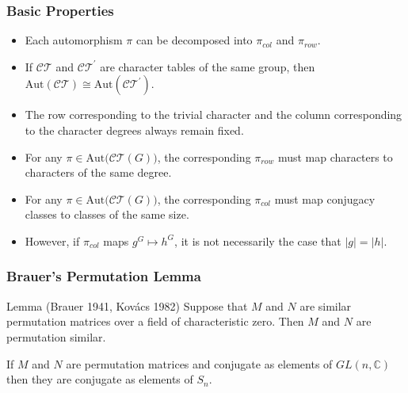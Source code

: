 \documentclass[xcolor=dvipsnames]{beamer}
\theoremstyle{remark}
\theoremstyle{plain}
\theoremstyle{definition}
\begin{document}
\begin{frame}
\frametitle{Basic Properties}
\begin{itemize}
\pause
\item Each automorphism $\pi$ can be decomposed into $\pi_{col}$ and
  $\pi_{row}$.\pause
\item If $\mathcal{CT}$ and $\mathcal{CT}^{\prime}$ are character
  tables of the same group, then $\mathrm{Aut}(\mathcal{CT})\cong\mathrm{Aut}(\mathcal{CT}^{\prime})$.\pause
\item The row corresponding to the trivial character and the column
  corresponding to the character degrees always remain fixed.\pause
\item For any $\pi\in\mathrm{Aut(}\mathcal{CT}(G)\mathrm{)}$, the
  corresponding $\pi_{row}$ must map characters to characters of the
  same degree.\pause
\item For any $\pi\in\mathrm{Aut(}\mathcal{CT}(G)\mathrm{)}$, the
  corresponding $\pi_{col}$ must map conjugacy classes to classes
  of the same size.\pause
\item However, if $\pi_{col}$ maps $g^G\mapsto h^G$, it is not
  necessarily the case that $|g|=|h|$.
\end{itemize}
\end{frame}

\begin{frame}
\frametitle{Brauer's Permutation Lemma}
\begin{block}{Lemma (Brauer 1941, Kov\'acs 1982)}
  Suppose that $M$ and $N$ are similar permutation matrices over a
  field of characteristic zero. Then $M$ and $N$ are permutation
  similar. \pause

If $M$ and $N$ are permutation matrices and conjugate as elements of
$GL(n,\mathbb{C})$ then they are conjugate as elements of $S_n$.
\end{block}
\end{frame}
\end{document}
